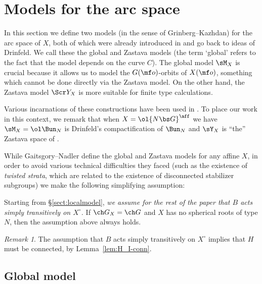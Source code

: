 \documentclass[final]{amsart}
\theoremstyle{remark}
\newtheorem{rem}[subsubsection]{Remark}
\theoremstyle{definition}
\numberwithin{equation}{section}
\begin{document}
\section{Models for the arc space} \label{sect:models}

In this section we define two models (in the sense of Grinberg--Kazhdan) 
for the arc space of $X$, both of which
were already introduced in \cite{GN} and go back to ideas of Drinfeld. 
We call these the global and Zastava models (the term `global' refers to the fact
that the model depends on the curve $C$). 
The global model $\sM_X$ is crucial because it allows us to model the $G(\mf o)$-orbits of $X(\mf o)$,
something which cannot be done directly via the Zastava model. 
On the other hand, the Zastava model $\Scr Y_X$ is more suitable for finite type calculations. 

\smallskip

Various incarnations of these constructions have been used in 
\cite{FM, FFKM, BG, BFGM, BFG, ABB}.
To place our work in this context, we remark that when $X = \ol{N\bs G}^\aff$ 
we have $\sM_X = \ol\Bun_N$ is Drinfeld's compactification of $\Bun_N$ 
and $\sY_X$ is ``the'' Zastava space of \cite{FM}. %

\smallskip

While Gaitsgory--Nadler define the global and Zastava models for any affine $X$, 
in order to avoid various technical difficulties they faced (such as the existence
of \emph{twisted strata}, which are related to the existence of 
disconnected stabilizer subgroups) we make the following simplifying assumption:

\medskip

Starting from \S\ref{sect:localmodel}, 
\emph{we assume for the rest of the paper that $B$ acts simply transitively on $X^\circ$.} 
If $\ch G_X = \ch G$ and $X$ has no spherical roots of type $N$, then the assumption above always holds. 


\begin{rem} \label{rem:Hconnected}
The assumption that $B$ acts simply transitively on $X^\circ$ implies that $H$ must
be connected, by Lemma~\ref{lem:H_I-conn}. 
\end{rem}


\subsection{Global model}
\end{document}
